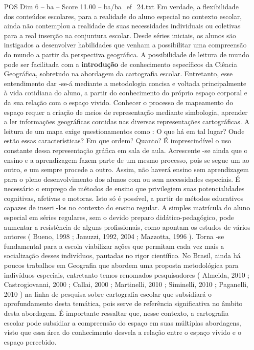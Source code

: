 \begin{textsample}{POS Dim 6 – ba – Score 11.00 – ba/ba\_ef\_24.txt}
Em verdade, a flexibilidade dos conteúdos escolares, para a realidade do aluno especial no contexto escolar, ainda não contemplou a realidade de suas necessidades individuais ou coletivas para a real inserção na conjuntura escolar.
Desde séries iniciais, os alunos são instigados a desenvolver habilidades que venham a possibilitar uma compreensão do mundo a partir da perspectiva geográfica.
A possibilidade de leitura de mundo pode ser facilitada com a \textbf{introdução} de conhecimento específicos da Ciência Geográfica, sobretudo na abordagem da cartografia escolar.
Entretanto, esse entendimento dar -se-á mediante a metodologia concisa e voltada principalmente à vida cotidiana do aluno, a partir do conhecimento do próprio espaço corporal e da sua relação com o espaço vivido.
Conhecer o processo de mapeamento do espaço requer a criação de meios de representação mediante simbologia, aprender a ler informações geográficas contidas nas diversas representações cartográficas.
A leitura de um mapa exige questionamentos como : O que há em tal lugar?
Onde estão essas características?
Em que ordem?
Quanto?
É imprescindível o uso constante dessa representação gráfica em sala de aula.
Acrescente -se ainda que o ensino e a aprendizagem fazem parte de um mesmo processo, pois se segue um ao outro, e um sempre procede a outro.
Assim, não haverá ensino sem aprendizagem para o pleno desenvolvimento dos alunos com ou sem necessidades especiais.
É necessário o emprego de métodos de ensino que privilegiem suas potencialidades cognitivas, afetivas e motoras.
Isto só é possível, a partir de métodos educativos capazes de inseri -los no contexto do ensino regular.
A simples matrícula do aluno especial em séries regulares, sem o devido preparo didático-pedagógico, pode aumentar a resistência de alguns profissionais, como apontam os estudos de vários autores ( Bueno, 1998 ; Januzzi, 1992, 2004 ; Mazzotta, 1996 ).
Torna -se fundamental para a escola viabilizar ações que permitam cada vez mais a socialização desses indivíduos, pautadas no rigor científico.
No Brasil, ainda há poucos trabalhos em Geografia que abordem uma proposta metodológica para indivíduos especiais, entretanto temos renomados pesquisadores ( Almeida, 2010 ; Castrogiovanni, 2000 ; Callai, 2000 ; Martinelli, 2010 ; Siminelli, 2010 ; Paganelli, 2010 ) na linha de pesquisa sobre cartografia escolar que subsidiará o aprofundamento desta temática, pois serve de referência significativa no âmbito desta abordagem.
É importante ressaltar que, nesse contexto, a cartografia escolar pode subsidiar a compreensão do espaço em suas múltiplas abordagens, visto que essa área do conhecimento desvela a relação entre o espaço vivido e o espaço percebido.

\end{textsample}
